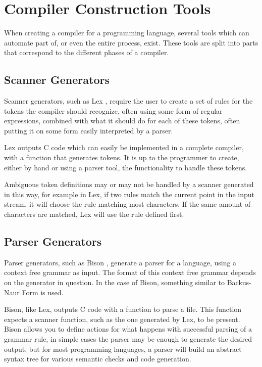 \section{Compiler Construction Tools}

  When creating a compiler for a programming language, several tools which can automate part
  of, or even the entire process, exist. These tools are split into parts that correspond to 
  the different phases of a compiler.
  
  \subsection{Scanner Generators}
  
    Scanner generators, such as Lex \cite{yacchome1}, require the user to create a set of rules
    for the tokens the compiler should recognize, often using some form of regular expressions,
    combined with what it should do for each of these tokens, often putting it on some form
    easily interpreted by a parser.
    
    Lex outputs C code which can easily be implemented in a complete compiler, with a function that
    generates tokens. It is up to the programmer to create, either by hand or using a parser
    tool, the functionality to handle these tokens.
    
    Ambiguous token definitions may or may not be handled by a scanner generated in this way,
    for example in Lex, if two rules match the current point in the input stream, it will
    choose the rule matching most characters. If the same amount of characters are matched,
    Lex will use the rule defined first.
    
  \subsection{Parser Generators}
    
    Parser generators, such as Bison \cite{yacchome2}, generate a parser for a language, using a
    context free grammar as input. The format of this context free grammar depends on the
    generator in question. In the case of Bison, something similar to Backus-Naur Form is used.
    
    Bison, like Lex, outputs C code with a function to parse a file. This function expects a
    scanner function, such as the one generated by Lex, to be present. Bison allows you to define
    actions for what happens with successful parsing of a grammar rule, in simple cases the parser
    may be enough to generate the desired output, but for most programming languages, a parser will
    build an abstract syntax tree for various semantic checks and code generation.
    
